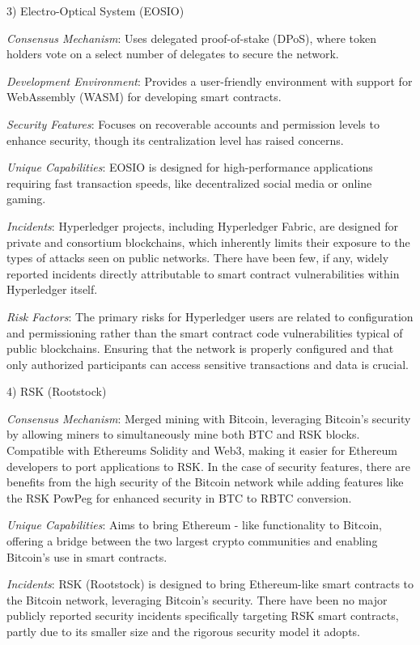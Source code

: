 3) Electro-Optical System (EOSIO)

\emph{Consensus Mechanism}: Uses delegated proof-of-stake (DPoS), where
token holders vote on a select number of delegates to secure the
network.

\emph{Development Environment}: Provides a user-friendly environment
with support for WebAssembly (WASM) for developing smart contracts.

\emph{Security Features}: Focuses on recoverable accounts and permission
levels to enhance security, though its centralization level has raised
concerns.

\emph{Unique Capabilities}: EOSIO is designed for high-performance
applications requiring fast transaction speeds, like decentralized
social media or online gaming.

\emph{Incidents}: Hyperledger projects, including Hyperledger Fabric,
are designed for private and consortium blockchains, which inherently
limits their exposure to the types of attacks seen on public networks.
There have been few, if any, widely reported incidents directly
attributable to smart contract vulnerabilities within Hyperledger
itself.

\emph{Risk Factors}: The primary risks for Hyperledger users are related
to configuration and permissioning rather than the smart contract code
vulnerabilities typical of public blockchains. Ensuring that the network
is properly configured and that only authorized participants can access
sensitive transactions and data is crucial.

4) RSK (Rootstock)

\emph{Consensus Mechanism}: Merged mining with Bitcoin, leveraging
Bitcoin's security by allowing miners to simultaneously mine both BTC
and RSK blocks. Compatible with Ethereum\textquotesingle s Solidity and
Web3, making it easier for Ethereum developers to port applications to
RSK. In the case of security features, there are benefits from the high
security of the Bitcoin network while adding features like the RSK
PowPeg for enhanced security in BTC to RBTC conversion.

\emph{Unique Capabilities}: Aims to bring Ethereum - like functionality
to Bitcoin, offering a bridge between the two largest crypto communities
and enabling Bitcoin's use in smart contracts.

\emph{Incidents}: RSK (Rootstock) is designed to bring Ethereum-like
smart contracts to the Bitcoin network, leveraging Bitcoin's security.
There have been no major publicly reported security incidents
specifically targeting RSK smart contracts, partly due to its smaller
size and the rigorous security model it adopts.

